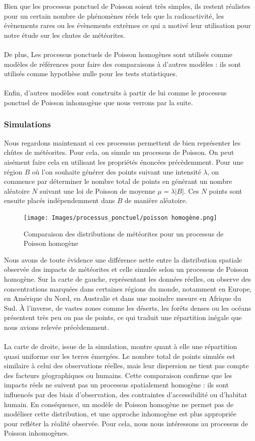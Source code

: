 \documentclass[12pt]{article}
\begin{document}
Bien que les processus ponctuel de Poisson soient très simples, ils restent réalistes pour un certain nombre de phénomènes réels tels que la radioactivité, les évènements rares ou les évènements extrèmes ce qui a motivé leur utilisation pour notre étude sur les chutes de météorites.\\
\\
De plus, Les processus ponctuels de Poisson homogènes sont utilisés comme modèles de références pour faire des comparaisons à d'autres modèles : ils sont utilisés comme hypothèse nulle pour les tests statistiques.\\
\\
Enfin, d'autres modèles sont construits à partir de lui comme le processus ponctuel de Poisson inhomogène que nous verrons par la suite.
\subsubsection*{Simulations}
Nous regardons maintenant si ces processus permettent de bien représenter les chûtes de météorites. Pour cela, on simule un processus de Poisson. On peut aisément faire cela en utilisant les propriétés énoncées précèdemment. Pour une région $B$ où l'on souhaite générer des points suivant une intensité $\lambda$, on commence par déterminer le nombre total de points en générant un nombre aléatoire $N$ suivant une loi de Poisson de moyenne $\mu = \lambda|B|$. Ces $N$ points sont ensuite placés indépendemment dans $B$ de manière aléatoire.

\begin{figure}[H]
    \centering
    \texttt{[image: Images/processus\_ponctuel/poisson homogène.png]}
    \caption{Comparaison des distributions de météorites pour un processus de Poisson homogène}
\end{figure}
Nous avons de toute évidence une différence nette entre la distribution spatiale observée des impacts de météorites et celle simulée selon un processus de Poisson homogène. Sur la carte de gauche, représentant les données réelles, on observe des concentrations marquées dans certaines régions du monde, notamment en Europe, en Amérique du Nord, en Australie et dans une moindre mesure en Afrique du Sud. À l’inverse, de vastes zones comme les déserts, les forêts denses ou les océans présentent très peu ou pas de points, ce qui traduit une répartition inégale que nous avions relevée précèdemment.\\
\\
La carte de droite, issue de la simulation, montre quant à elle une répartition quasi uniforme sur les terres émergées. Le nombre total de points simulés est similaire à celui des observations réelles, mais leur dispersion ne tient pas compte des facteurs géographiques ou humains. Cette comparaison confirme que les impacts réels ne suivent pas un processus spatialement homogène : ils sont influencés par des biais d’observation, des contraintes d’accessibilité ou d’habitat humain. En conséquence, un modèle de Poisson homogène ne permet pas de modéliser cette distribution, et une approche inhomogène est plus appropriée pour refléter la réalité observée. Pour cela, nous nous intéressons au processus de Poisson inhomogènes.
\end{document}
